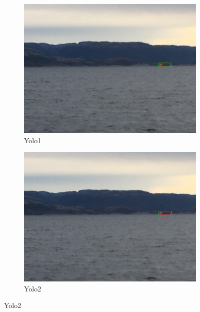 \begin{figure}[h!]
\begin{subfigure}{.5\textwidth}
  \centering
  \includegraphics[width=0.8\linewidth]{results/case_tr_moor/yolo12/yolo1/2better/IMG_2591.jpg}
  \caption{Yolo1}
\end{subfigure}%
\begin{subfigure}{.5\textwidth}
  \centering
  \includegraphics[width=.8\linewidth]{results/case_tr_moor/yolo12/yolo2/2better/IMG_2591.jpg}
  \caption{Yolo2}
\end{subfigure}


\end{figure}
